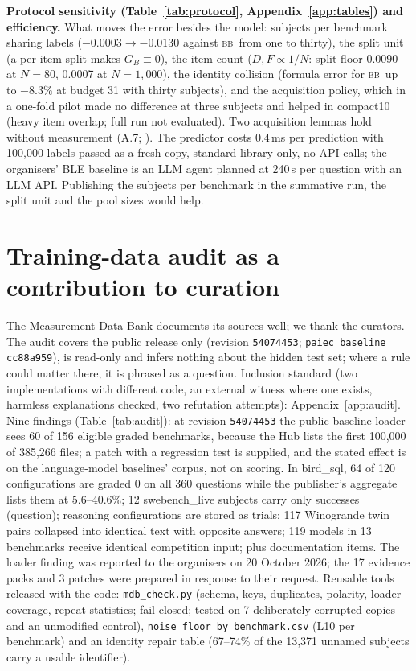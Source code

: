\documentclass{article}
\newcommand{\BB}{\textsc{bb}}
\begin{document}
\textbf{Protocol sensitivity (Table~\ref{tab:protocol}, Appendix~\ref{app:tables}) and efficiency.} What moves the
error besides the model: subjects per benchmark sharing labels ($-0.0003 \to -0.0130$ against \BB\ from one to
thirty), the split unit (a per-item split makes $G_B \equiv 0$), the item count ($D, F \propto 1/N$: split floor 0.0090
at $N = 80$, 0.0007 at $N = 1{,}000$), the identity collision (formula error for \BB\ up to $-8.3\%$ at budget 31 with
thirty subjects), and the acquisition policy, which in a one-fold pilot made no difference at three subjects and helped
in compact10 (heavy item overlap; full run not evaluated). Two acquisition lemmas hold without measurement (A.7; \citealp{rubin1976, kossen2021activetesting}). The predictor
costs 0.4\,ms per prediction with 100,000 labels passed as a fresh copy, standard library only, no API calls; the
organisers' BLE baseline is an LLM agent planned at 240\,s per question with an LLM API. Publishing the subjects per benchmark in the summative run, the split unit and the pool sizes would help.

\section{Training-data audit as a contribution to curation}
\label{sec:audit}

The Measurement Data Bank documents its sources well; we thank the curators. The audit covers the public release only
(revision \texttt{54074453}; \texttt{paiec\_baseline} \texttt{cc88a959}), is read-only and infers nothing about the
hidden test set; where a rule could matter there, it is phrased as a question. Inclusion
standard (two implementations with different code, an external witness where one exists, harmless explanations
checked, two refutation attempts): Appendix~\ref{app:audit}. Nine findings (Table~\ref{tab:audit}): at revision \texttt{54074453} the public baseline
loader sees 60 of 156 eligible graded benchmarks, because the Hub lists the first 100,000 of 385,266 files; a patch with
a regression test is supplied, and the stated effect is on the language-model baselines' corpus, not on scoring. In
bird\_sql, 64 of 120 configurations are graded 0 on all 360 questions while the publisher's aggregate lists them at
5.6--40.6\%; 12 swebench\_live subjects carry only successes (question); reasoning configurations are stored as trials;
117 Winogrande twin pairs collapsed into identical text with opposite answers; 119 models in 13 benchmarks receive
identical competition input; plus documentation items. The loader finding was reported to the organisers on 20 October 2026; the 17 evidence packs and 3 patches were prepared
in response to their request. Reusable
tools released with the code: \texttt{mdb\_check.py} (schema, keys, duplicates, polarity, loader coverage, repeat
statistics; fail-closed; tested on 7 deliberately corrupted copies and an unmodified control), \texttt{noise\_floor\_by\_benchmark.csv}
(L10 per benchmark) and an identity repair table (67--74\% of the 13,371 unnamed subjects carry a usable identifier).
\end{document}
